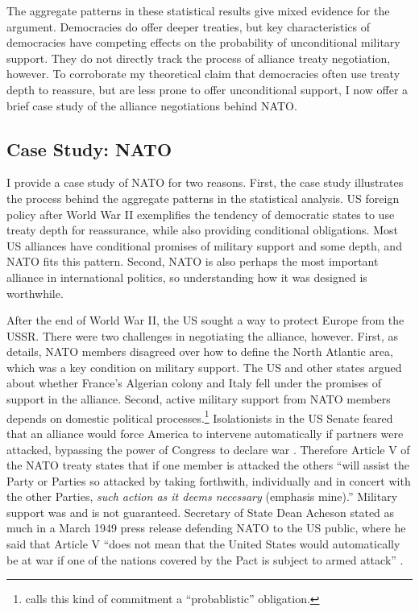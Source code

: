 \documentclass[12pt]{article}
\begin{document}
The aggregate patterns in these statistical results give mixed evidence for the argument. 
Democracies do offer deeper treaties, but key characteristics of democracies have competing effects on the probability of unconditional military support. 
They do not directly track the process of alliance treaty negotiation, however. 
To corroborate my theoretical claim that democracies often use treaty depth to reassure, but are less prone to offer unconditional support, I now offer a brief case study of the alliance negotiations behind NATO. 


\subsection{Case Study: NATO}


I provide a case study of NATO for two reasons. 
First, the case study illustrates the process behind the aggregate patterns in the statistical analysis. 
US foreign policy after World War II exemplifies the tendency of democratic states to use treaty depth for reassurance, while also providing conditional obligations.  
Most US alliances have conditional promises of military support and some depth, and NATO fits this pattern.
Second, NATO is also perhaps the most important alliance in international politics, so understanding how it was designed is worthwhile. 


After the end of World War II, the US sought a way to protect Europe from the USSR. 
There were two challenges in negotiating the alliance, however.
First, as \citet{Poast2019a} details, NATO members disagreed over how to define the North Atlantic area, which was a key condition on military support. 
The US and other states argued about whether France's Algerian colony and Italy fell under the promises of support in the alliance. 
Second, active military support from NATO members depends on domestic political processes.\footnote{\citet{Benson2012} calls this kind of commitment a ``probablistic'' obligation.} 
Isolationists in the US Senate feared that an alliance would force America to intervene automatically if partners were attacked, bypassing the power of Congress to declare war \citep[pg. 280-1]{Acheson1969}.
Therefore Article V of the NATO treaty states that if one member is attacked the others ``will assist the Party or Parties so attacked by taking forthwith, individually and in concert with the other Parties, \emph{such action as it deems necessary} (emphasis mine).'' 
Military support was and is not guaranteed. 
Secretary of State Dean Acheson stated as much in a March 1949 press release defending NATO to the US public, where he said that Article V ``does not mean that the United States would automatically be at war if one of the nations covered by the Pact is subject to armed attack'' \citep{Acheson1949}. 
\end{document}
